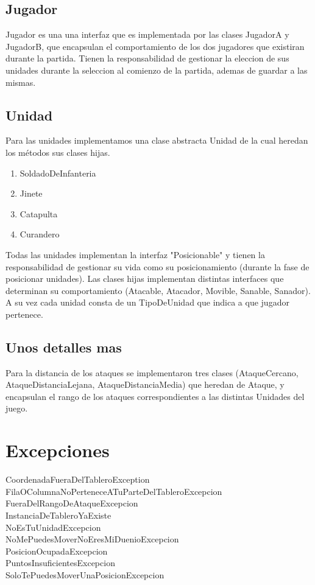 \documentclass[titlepage,a4paper]{article}
\begin{document}
\subsection{Jugador}
Jugador es una una interfaz que es implementada por las clases JugadorA y JugadorB, que encapsulan el comportamiento de los dos jugadores que existiran durante la partida. Tienen la responsabilidad de gestionar la eleccion de sus unidades durante la seleccion al comienzo de la partida, ademas de guardar a las mismas.

\subsection{Unidad}
 Para las unidades implementamos una clase abstracta Unidad de la cual heredan los métodos sus clases hijas.
  \begin{enumerate}
      \item SoldadoDeInfanteria
      \item Jinete
      \item Catapulta
      \item Curandero
  \end{enumerate}
Todas las unidades implementan la interfaz "Posicionable" y tienen la responsabilidad de gestionar su vida como su posicionamiento (durante la fase de posicionar unidades). Las clases hijas implementan distintas interfaces que determinan su comportamiento (Atacable, Atacador, Movible, Sanable, Sanador). A su vez cada unidad consta de un TipoDeUnidad que indica a que jugador pertenece.
\subsection{Unos detalles mas}
Para la distancia de los ataques se implementaron tres clases (AtaqueCercano, AtaqueDistanciaLejana, AtaqueDistanciaMedia) que heredan de Ataque, y encapsulan el rango de los ataques correspondientes a las distintas Unidades del juego.



\section{Excepciones}\label{sec:excepciones}

\begin{description}
\item[CoordenadaFueraDelTableroException] 
\item[FilaOColumnaNoPerteneceATuParteDelTableroExcepcion]
\item[FueraDelRangoDeAtaqueExcepcion] 
\item[InstanciaDeTableroYaExiste] 
\item[NoEsTuUnidadExcepcion] 
\item[NoMePuedesMoverNoEresMiDuenioExcepcion] 
\item[PosicionOcupadaExcepcion] 
\item[PuntosInsuficientesExcepcion] 
\item[SoloTePuedesMoverUnaPosicionExcepcion] 





\end{description}
\end{document}

